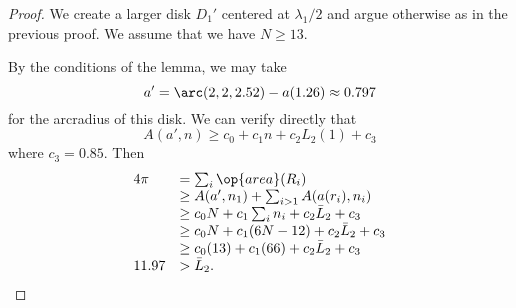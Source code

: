 \begin{proof}  We create
a larger disk $D_1'$ centered at $\lambda_1/2$ and argue otherwise
as in the previous proof.  We assume that we have $N\ge 13$.


By the conditions of the lemma, we may take 
$$a'=\arc(2,2,2.52)-a(1.26) \approx 0.797$$
for the arcradius of this disk.  We can verify directly that
$$A(a',n) \ge c_0 + c_1 n + c_2 L_2(1) + c_3$$
where $c_3 = 0.85$.
Then 
$$
\begin{array}{lll}
4\pi &= \sum_i\op{area}(R_i)\\
     &\ge A(a',n_1)+\sum_{i>1} A(a(r_i),n_i) \\
     &\ge  c_0 N +c_1\sum_i n_i + c_2 \bar L_2 + c_3\\
     &\ge c_0 N +c_1 (6N-12) + c_2 \bar L_2 + c_3\\
     &\ge  c_0 (13) +c_1 (66) + c_2 \bar L_2 + c_3\\
11.97 &> \bar L_2. 
\end{array}
$$
\end{proof}

